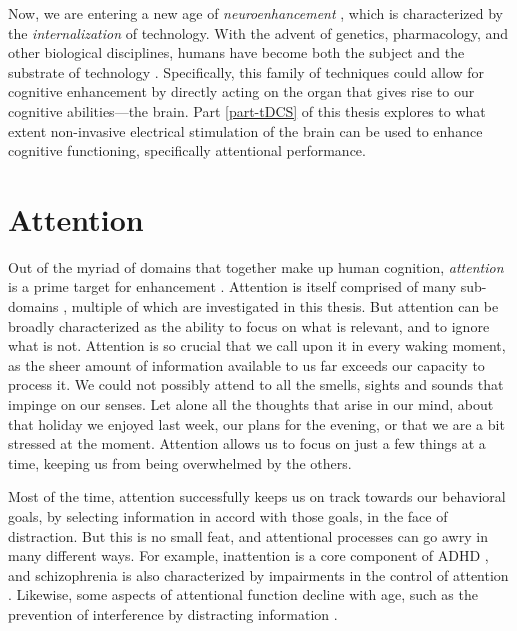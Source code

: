 \documentclass[11pt,english,]{memoir}
\begin{document}
Now, we are entering a new age of \emph{neuroenhancement} \autocite{Clark2014}, which is characterized by the \emph{internalization} of technology. With the advent of genetics, pharmacology, and other biological disciplines, humans have become both the subject and the substrate of technology \autocite{Stiegler1998}. Specifically, this family of techniques could allow for cognitive enhancement by directly acting on the organ that gives rise to our cognitive abilities---the brain. Part \ref{part-tDCS} of this thesis explores to what extent non-invasive electrical stimulation of the brain \autocites{CohenKadosh2014}{Dayan2013} can be used to enhance cognitive functioning, specifically attentional performance.

\hypertarget{attention}{%
\section{Attention}\label{attention}}

Out of the myriad of domains that together make up human cognition, \emph{attention} is a prime target for enhancement \autocite{Reteig2017}. Attention is itself comprised of many sub-domains \autocite{Chun2011}, multiple of which are investigated in this thesis. But attention can be broadly characterized as the ability to focus on what is relevant, and to ignore what is not. Attention is so crucial that we call upon it in every waking moment, as the sheer amount of information available to us far exceeds our capacity to process it. We could not possibly attend to all the smells, sights and sounds that impinge on our senses. Let alone all the thoughts that arise in our mind, about that holiday we enjoyed last week, our plans for the evening, or that we are a bit stressed at the moment. Attention allows us to focus on just a few things at a time, keeping us from being overwhelmed by the others.

Most of the time, attention successfully keeps us on track towards our behavioral goals, by selecting information in accord with those goals, in the face of distraction. But this is no small feat, and attentional processes can go awry in many different ways. For example, inattention is a core component of ADHD \autocite{AmericanPsychiatricAssociation2013}, and schizophrenia is also characterized by impairments in the control of attention \autocite{Luck2008}. Likewise, some aspects of attentional function decline with age, such as the prevention of interference by distracting information \autocite{McNab2015}.
\end{document}
